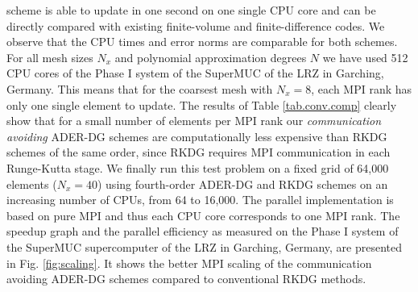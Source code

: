 scheme is able to update in one second on one single CPU core and can be
directly compared with existing finite-volume and finite-difference
codes.  We observe that the CPU times and error norms are comparable for
both schemes.
% 
For all mesh sizes $N_x$ and polynomial approximation degrees $N$ we have used  
512 CPU cores of the Phase I system of the SuperMUC of the LRZ in Garching, 
Germany. This means that for the coarsest mesh with $N_x=8$, each MPI rank has 
only one single element to update. The results of Table \ref{tab.conv.comp} 
clearly show that for a small number of elements per MPI rank our 
\textit{communication avoiding} ADER-DG schemes are computationally 
less expensive than RKDG schemes of the same order, since RKDG requires MPI 
communication in each Runge-Kutta stage. We finally run this test problem on 
a fixed grid of 64,000 elements ($N_x=40$) using fourth-order ADER-DG
and RKDG schemes on an increasing number of CPUs, from 64 to 16,000. 
The parallel implementation is based on pure MPI and thus each CPU core 
corresponds to one MPI rank.  
The speedup graph and the parallel efficiency as measured on the Phase I 
system of the SuperMUC supercomputer of the LRZ in Garching, Germany, are  
presented in Fig. \ref{fig:scaling}. 
It shows the better MPI scaling of the communication avoiding ADER-DG schemes 
compared to conventional RKDG methods. 
%
